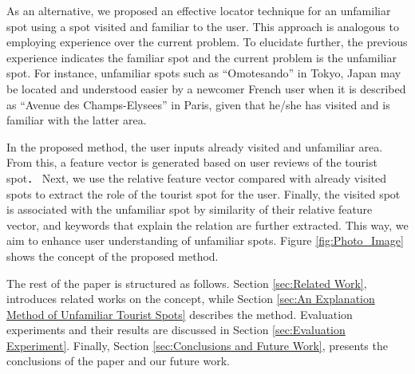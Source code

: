 \documentclass[journal]{IAENGtran}
\begin{document}
As an alternative, we proposed an effective locator technique for an unfamiliar spot using a spot visited and familiar to the user.
This approach is analogous to employing experience over the current problem.
To elucidate further, the previous experience indicates the familiar spot and the current problem is the unfamiliar spot.
For instance, unfamiliar spots such as ``Omotesando'' in Tokyo, Japan may be located and understood easier by a newcomer French user when it is described as ``Avenue des Champs-Elysees'' in Paris, given that he/she has visited and is familiar with the latter area.

In the proposed method, the user inputs already visited and unfamiliar area.
From this, a feature vector is generated based on user reviews of the tourist spot．
Next, we use the relative feature vector compared with already visited spots to extract the role of the tourist spot for the user.
Finally, the visited spot is associated with the unfamiliar spot by similarity of their relative feature vector, and keywords that explain the relation are further extracted.
This way, we aim to enhance user understanding of unfamiliar spots.
Figure \ref{fig:Photo_Image} shows the concept of the proposed method.

The rest of the paper is structured as follows.
Section \ref{sec:Related Work}, introduces related works on the concept, while Section \ref{sec:An Explanation Method of Unfamiliar Tourist Spots} describes the method.
Evaluation experiments and their results are discussed in Section \ref{sec:Evaluation Experiment}.
Finally, Section \ref{sec:Conclusions and Future Work}, presents the conclusions of the paper and our future work.
\end{document}
